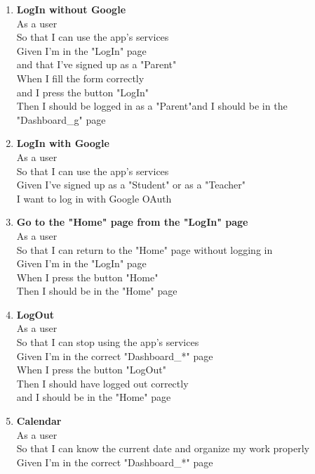 \documentclass[Lau, binding=0.6cm, oneside]{sapthesis}
\begin{document}
\begin{enumerate}
	\item \textbf{LogIn without Google}\\
			As a user\\
			So that I can use the app’s services\\
			Given I’m in the "LogIn" page\\
			and that I’ve signed up as a "Parent"\\
			When I fill the form correctly\\
			and I press the button "LogIn"\\
			Then I should be logged in as a "Parent"and I should be in the "Dashboard\_g" page\\
	\item \textbf{LogIn with Google}\\
			As a user\\
			So that I can use the app’s services\\
			Given I’ve signed up as a "Student" or as a "Teacher"\\
			I want to log in with Google OAuth\\
	\item \textbf{Go to the "Home" page from the "LogIn" page}\\
			As a user\\
			So that I can return to the "Home" page without logging in\\
			Given I’m in the "LogIn" page\\
			When I press the button "Home"\\
			Then I should be in the "Home" page\\
	\item \textbf{LogOut}\\
			As a user\\
			So that I can stop using the app’s services\\
			Given I’m in the correct "Dashboard\_*" page\\
			When I press the button "LogOut"\\
			Then I should have logged out correctly\\
			and I should be in the "Home" page\\
	\item \textbf{Calendar}\\
			As a user\\
			So that I can know the current date and organize my work properly\\
			Given I’m in the correct "Dashboard\_*" page\\

\end{enumerate}
\end{document}
